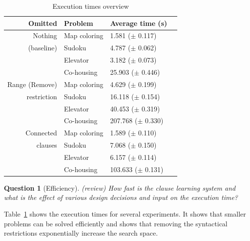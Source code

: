 \documentclass[letterpaper]{article}
\newtheorem{question}{Question}
\theoremstyle{definition}
\newcommand{\sam}[1]{{\color{red}(#1)}}
\begin{document}
\begin{table}
  \caption{Execution times overview}
  \begin{tabularx}{\linewidth}{rl|ll}

\textbf{Omitted}  & \textbf{Problem}    & \textbf{Average time (s)} \\ %
\toprule
Nothing           & Map coloring        & 1.581   ($\pm$ 0.117)     \\ %
   (baseline)     & Sudoku              & 4.787   ($\pm$ 0.062)     \\ %
                  & Elevator            & 3.182   ($\pm$ 0.073)     \\ %
                  & Co-housing          & 25.903  ($\pm$ 0.446)     \\ %
\midrule
Range \sam{Remove}             & Map coloring        & 4.629   ($\pm$ 0.199)     \\ %
restriction       & Sudoku              & 16.118  ($\pm$ 0.154)     \\ %
                  & Elevator            & 40.453  ($\pm$ 0.319)     \\ %
                  & Co-housing          & 207.768 ($\pm$ 0.330)     \\ %
\midrule
Connected         & Map coloring        & 1.589   ($\pm$ 0.110)     \\ %
    clauses       & Sudoku              & 7.068   ($\pm$ 0.150)     \\ %
                  & Elevator            & 6.157   ($\pm$ 0.114)     \\ %
                  & Co-housing          & 103.633 ($\pm$ 0.131)     \\ %
  \end{tabularx}
  \label{tbl:uitvoering}
\end{table}

\begin{question}[Efficiency] \sam{review}
  How fast is the clause learning system and what is the effect of various design decisions and input on the execution time?
\end{question}

Table~\ref{tbl:uitvoering} shows the execution times for several experiments.
It shows that smaller problems can be solved efficiently and shows that removing the syntactical restrictions exponentially increase the search space.
\end{document}
